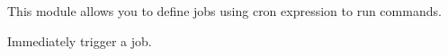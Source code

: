 \label{ch:command_scheduler}

This module allows you to define jobs using cron expression to run commands.

Immediately trigger a job.
